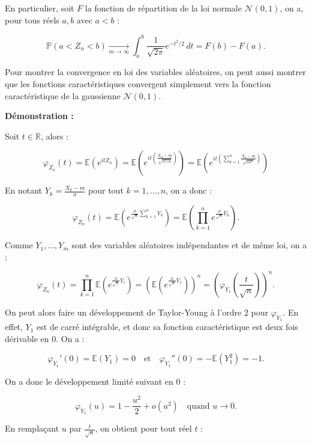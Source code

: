 \documentclass{article}
\begin{document}
\noindent
En particulier, soit $F$ la fonction de répartition de la loi normale $\mathcal{N}(0,1)$, on a, pour tous réels $a, b$ avec $a < b$ :

\[
\mathbb{P}\left(a < Z_n < b\right) \xrightarrow[m \to \infty]{} \int_a^b \frac{1}{\sqrt{2\pi}} e^{-t^2/2} \, dt = F(b) - F(a).
\]

\noindent
Pour montrer la convergence en loi des variables aléatoires, on peut aussi montrer que les fonctions caractéristiques convergent simplement vers la fonction caractéristique de la gaussienne $\mathcal{N}(0,1)$.

\vspace{1cm}
\noindent
\textbf{Démonstration :}

\vspace{0.3cm}
\noindent

Soit $t \in \mathbb{R}$, alors :

\[
\varphi_{Z_n}(t) = \mathbb{E} \left( e^{it Z_n} \right) = \mathbb{E} \left( e^{it \left( \frac{\overline{X}_n - m}{\sqrt{\sigma^2 / n}} \right)} \right) = \mathbb{E} \left( e^{it \left( \sum_{k=1}^{n} \frac{X_k - m}{\sqrt{n \sigma^2}} \right)} \right)
\]

En notant $Y_k = \frac{X_k - m}{\sigma}$ pour tout $k = 1, \ldots, n$, on a  donc :

\[
\varphi_{Z_n}(t) = \mathbb{E} \left( e^{\frac{it}{\sqrt{n}} \sum_{k=1}^{n} Y_k} \right) = \mathbb{E} \left( \prod_{k=1}^{n} e^{\frac{it}{\sqrt{n}} Y_k} \right).
\]

Comme $Y_1, \ldots, Y_m$ sont des variables aléatoires indépendantes et de même loi, on a :

\[
\varphi_{Z_n}(t) = \prod_{k=1}^{n} \mathbb{E} \left( e^{\frac{it}{\sqrt{n}} Y_i} \right) = \left( \mathbb{E} \left( e^{\frac{it}{\sqrt{n}} Y_1} \right) \right)^n = \left( \varphi_{Y_1} \left( \frac{t}{\sqrt{n}} \right) \right)^n.
\]

\noindent
On peut alors faire un développement de Taylor-Young à l'ordre 2 pour $\varphi_{Y_1}$. En effet, $Y_1$ est de carré intégrable, et donc sa fonction caractéristique est deux fois dérivable en 0. On a :

\[
\varphi_{Y_1}'(0) = \mathbb{E}(Y_1) = 0 \quad \text{et} \quad \varphi_{Y_1}''(0) = -\mathbb{E}(Y_1^2) = -1.
\]

On a donc le développement limité suivant en 0 :

\[
\varphi_{Y_1}(u) = 1 - \frac{u^2}{2} + o(u^2) \quad \text{quand } u \to 0.
\]

En remplaçant $u$ par $\frac{t}{\sqrt{n}}$, on obtient pour tout réel $t$ :
\end{document}
